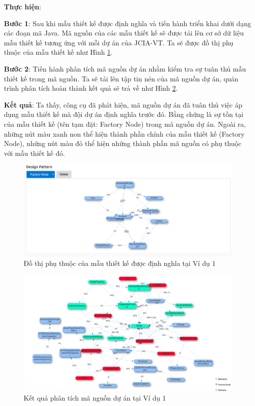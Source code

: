 \documentclass[12pt]{report}
\begin{document}
\noindent \textbf{Thực hiện}:

\noindent \textbf{Bước 1}: Sau khi mẫu thiết kế được định nghĩa và tiến hành triển khai dưới dạng các đoạn mã Java. Mã nguồn của các mẫu thiết kế sẽ được tải lên cơ sở dữ liệu mẫu thiết kế tương ứng với mỗi dự án của JCIA-VT. Ta sẽ được đồ thị phụ thuộc của mẫu thiết kế như Hình \ref{fig:node_fac_graph}.

\noindent \textbf{Bước 2}: Tiến hành phân tích mã nguồn dự án nhằm kiểm tra sự tuân thủ mẫu thiết kế trong mã nguồn. Ta sẽ tải lên tập tin nén của mã nguồn dự án, quán trình phân tích hoàn thành kết quả sẽ trả về như Hình \ref{fig:result_example_1}.

\noindent \textbf{Kết quả}: Ta thấy, công cụ đã phát hiện, mã nguồn dự án đã tuân thủ việc áp dụng mẫu thiết kế mà đội dự án định nghĩa trước đó. Bằng chứng là sự tồn tại của mẫu thiết kế (tên tạm đặt: Factory Node) trong mã nguồn dự án. Ngoài ra, những nút màu xanh non thể hiện thành phần chính của mẫu thiết kế (Factory Node), những nút màu đỏ thể hiện những thành phần mã nguồn có phụ thuộc với mẫu thiết kế đó.
\begin{figure}[h]
	\centering
	\includegraphics[scale=0.35]{images/node_fac_graph.png}
	\caption{Đồ thị phụ thuộc của mẫu thiết kế được định nghĩa tại Ví dụ 1}
	\label{fig:node_fac_graph}
\end{figure}
\begin{figure}[!h]
	\vspace{-0.5cm}
	\centering
	\includegraphics[scale=0.33]{images/node_fact_result.png}
	\caption{Kết quả phân tích mã nguồn dự án tại Ví dụ 1}
	\label{fig:result_example_1}
\end{figure}
\end{document}
